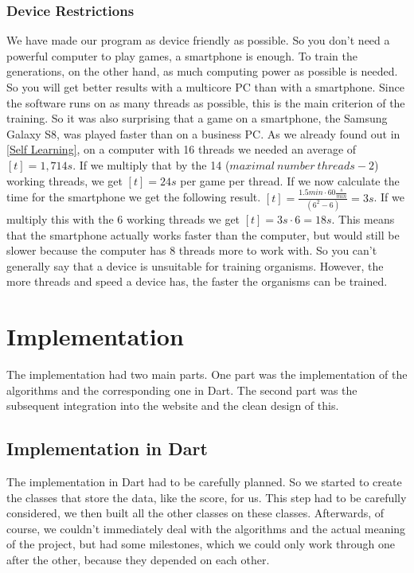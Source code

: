 \subsubsection{Device Restrictions}
We have made our program as device friendly as possible. So you don't need a powerful computer to play games, a smartphone is enough. To train the generations, on the other hand, as much computing power as possible is needed. So you will get better results with a multicore PC than with a smartphone. Since the software runs on as many threads as possible, this is the main criterion of the training. So it was also surprising that a game on a smartphone, the Samsung Galaxy S8, was played faster than on a business PC. 
As we already found out in \autoref{Self Learning}, on a computer with 16 threads we needed an average of $[t] = 1,714s$. If we multiply that by the 14 ($maximal\ number\ threads - 2$) working threads, we get $[t] = 24 s$ per game per thread.
If we now calculate the time for the smartphone we get the following result. $ [t] = \frac{1.5min \cdot 60\frac{s}{min}}{(6^2 - 6)} = 3s$. If we multiply this with the 6 working threads we get $[t] = 3s \cdot 6 = 18s$. This means that the smartphone actually works faster than the computer, but would still be slower because the computer has 8 threads more to work with. So you can't generally say that a device is unsuitable for training organisms. However, the more threads and speed a device has, the faster the organisms can be trained.

\section{Implementation}
The implementation had two main parts. One part was the implementation of the algorithms and the corresponding one in Dart. The second part was the subsequent integration into the website and the clean design of this.

\subsection{Implementation in Dart}
The implementation in Dart had to be carefully planned. So we started to create the classes that store the data, like the score, for us. This step had to be carefully considered, we then built all the other classes on these classes. Afterwards, of course, we couldn't immediately deal with the algorithms and the actual meaning of the project, but had some milestones, which we could only work through one after the other, because they depended on each other.

